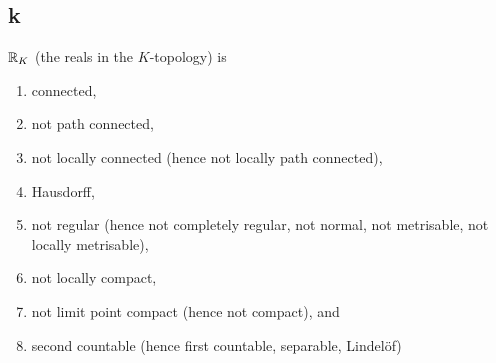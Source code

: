 
\subsection*{k}
  $\mathbb{R}_K$  (the reals in the $K$-topology) is
  \begin{enumerate}
  \item connected,
  \item not path connected,
  \item not locally connected (hence not locally path connected),
  \item Hausdorff,
  \item not regular (hence not completely regular, not normal, not metrisable, not locally metrisable),
  \item not locally compact,
  \item not limit point compact (hence not compact), and
  \item second countable (hence first countable, separable, Lindel\"of)
  \end{enumerate}

